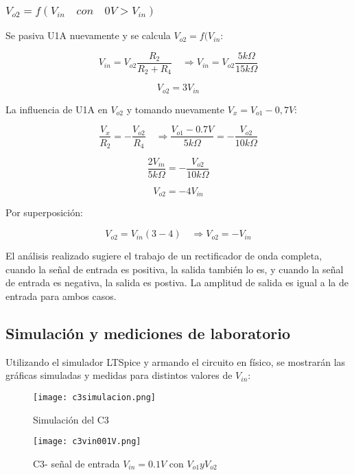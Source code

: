 \subsubsection{ $V_{o2} = f(V_{in} \quad con \quad 0V > V_{in}) $}

Se pasiva U1A nuevamente y se calcula  $V_{o2} = f(V_{in} $:

\[V_{in}= V_{o2}\frac{R_2}{R_2 + R_4} \quad  \Rightarrow V_{in} = V_{o2} \frac{5k\Omega}{15k\Omega} \]

\[V_{o2}= 3V_{in} \]

La influencia de U1A en $V_{o2}$ y tomando nuevamente $V_x = V_{o1} - 0,7V $:

\[ \frac{V_x}{R_2} = -\frac{V_{o2}}{R_4} \quad  \Rightarrow \frac{V_{o1}- 0.7V}{5k\Omega} = -\frac{V_{o2}}{10k\Omega} \]

\[ \frac{2V_{in}}{5k\Omega} = -\frac{V_{o2}}{10k\Omega} \]

\[ V_{o2} = -4V_{in} \]

Por superposición:

\[ V_{o2} =V_{in} (3-4) \quad  \Rightarrow V_{o2}= -V_{in} \]

\vspace{1em}

El análisis realizado sugiere el trabajo de un rectificador de onda completa, cuando la señal de entrada es positiva, la salida también lo es,
 y cuando la señal de entrada es negativa, la salida es postiva. La amplitud de salida es igual a la de entrada para ambos casos.

\subsection{Simulación y mediciones de laboratorio}

Utilizando el simulador LTSpice y armando el circuito en físico, se mostrarán las gráficas simuladas y medidas para distintos valores de $V_{in}$:

\vspace{1em}

  \begin{figure}[h!]
     \centering
     \texttt{[image: c3simulacion.png]}
     \caption{ Simulación del C3}
     \label{fig:enter-label}
 \end{figure}

\vspace{1em}

  \begin{figure}[h!]
     \centering
     \texttt{[image: c3vin001V.png]}
     \caption{C3- señal de entrada $V_{in} = 0.1V$ con  $V_{o1}  y  V_{o2}$}
     \label{fig:enter-label}
 \end{figure}
 
